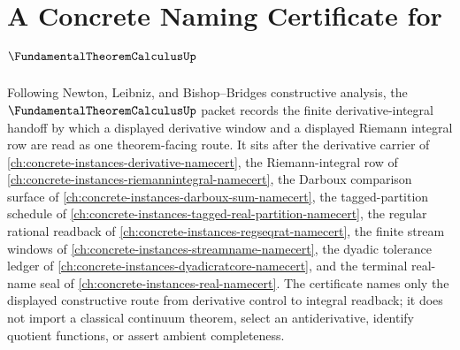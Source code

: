 \chapter{A Concrete Naming Certificate for $\FundamentalTheoremCalculusUp$}
\label{ch:concrete-instances-fundamental-theorem-calculus-namecert}

Following Newton, Leibniz, and Bishop--Bridges constructive analysis, the $\FundamentalTheoremCalculusUp$ packet records the finite derivative-integral handoff by which a displayed derivative window and a displayed Riemann integral row are read as one theorem-facing route. It sits after the derivative carrier of \autoref{ch:concrete-instances-derivative-namecert}, the Riemann-integral row of \autoref{ch:concrete-instances-riemannintegral-namecert}, the Darboux comparison surface of \autoref{ch:concrete-instances-darboux-sum-namecert}, the tagged-partition schedule of \autoref{ch:concrete-instances-tagged-real-partition-namecert}, the regular rational readback of \autoref{ch:concrete-instances-regseqrat-namecert}, the finite stream windows of \autoref{ch:concrete-instances-streamname-namecert}, the dyadic tolerance ledger of \autoref{ch:concrete-instances-dyadicratcore-namecert}, and the terminal real-name seal of \autoref{ch:concrete-instances-real-namecert}. The certificate names only the displayed constructive route from derivative control to integral readback; it does not import a classical continuum theorem, select an antiderivative, identify quotient functions, or assert ambient completeness.

